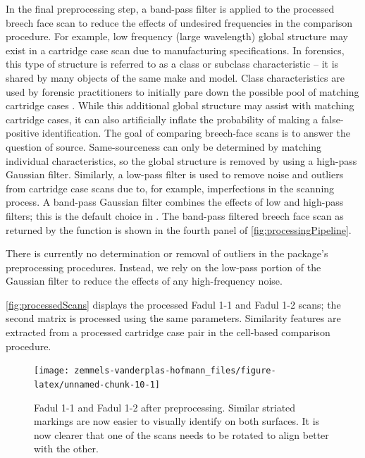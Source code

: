 In the final preprocessing step, a band-pass filter is applied to the
processed breech face scan to reduce the effects of undesired
frequencies in the comparison procedure. For example, low frequency
(large wavelength) global structure may exist in a cartridge case scan
due to manufacturing specifications. In forensics, this type of
structure is referred to as a class or subclass characteristic -- it is
shared by many objects of the same make and model. Class characteristics
are used by forensic practitioners to initially pare down the possible
pool of matching cartridge cases \citep{firearm_id_thompson}. While this
additional global structure may assist with matching cartridge cases, it
can also artificially inflate the probability of making a false-positive
identification. The goal of comparing breech-face scans is to answer the
question of source. Same-sourceness can only be determined by matching
individual characteristics, so the global structure is removed by using
a high-pass Gaussian filter. Similarly, a low-pass filter is used to
remove noise and outliers from cartridge case scans due to, for example,
imperfections in the scanning process. A band-pass Gaussian filter
combines the effects of low and high-pass filters; this is the default
choice in . The band-pass filtered breech face scan as
returned by the  function is shown in the
fourth panel of \autoref{fig:processingPipeline}.

There is currently no determination or removal of outliers in the
 package's preprocessing procedures. Instead, we rely on
the low-pass portion of the Gaussian filter to reduce the effects of any
high-frequency noise.

\autoref{fig:processedScans} displays the processed Fadul 1-1 and Fadul
1-2 scans; the second matrix is processed using the same parameters.
Similarity features are extracted from a processed cartridge case pair
in the cell-based comparison procedure.

\begin{Schunk}
\begin{figure}[htbp]

{\centering \texttt{[image: zemmels-vanderplas-hofmann\_files/figure-latex/unnamed-chunk-10-1]} 

}

\caption{\label{fig:processedScans} Fadul 1-1 and Fadul 1-2 after preprocessing. Similar striated markings are now easier to visually identify on both surfaces. It is now clearer that one of the scans needs to be rotated to align better with the other.}\label{fig:unnamed-chunk-10}
\end{figure}
\end{Schunk}

